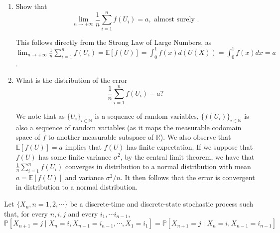 \documentclass[12pt,twoside, letter]{exam}
\theoremstyle{definition}
\newcommand{\nn}{\mathbb{N}}
\newcommand{\rr}{\mathbb{R}}
\newcommand{\ee}{\mathbb{E}}
\newcommand{\pp}{\mathbb{P}}
\begin{document}
\begin{enumerate}
  \item Show that
    \begin{equation*}
      \lim_{n \rightarrow +\infty} \frac{1}{n} \sum^n_{i=1} f(U_{i}) = a, \text{ almost surely }.
    \end{equation*}

    \begin{solution}
      This follows directly from the Strong Law of Large Numbers, as \\
      $\lim_{n \rightarrow +\infty} \frac{1}{n} \sum^n_{i=1} f(U_{i}) = \ee[f(U)] = \int^1_0 f(x) d(U(X)) = \int^1_0 f(x) dx = a$.
    \end{solution}

  \item What is the distribution of the error
    \begin{equation*}
      \frac{1}{n} \sum^{n}_{i = 1} f(U_{i}) - a?
    \end{equation*}

    \begin{solution}
      We note that as $\{U_i\}_{i\in\nn}$ is a sequence of random variables, $\{f(U_i)\}_{i\in\nn}$ is also a sequence of random variables (as it maps the measurable codomain space of $f$ to
      another measurable subspace of $\rr$). We also observe that $\ee[f(U)] = a$ implies that $f(U)$ has finite expectation. If we suppose that $f(U)$ has some finite variance $\sigma^{2}$, by
      the central limit theorem, we have that $\frac{1}{n} \sum^{n}_{i = 1} f(U_{i})$ converges in distribution to a normal distribution with mean $a = \ee[f(U)]$ and variance $\sigma^{2}/n$.
      It then follows that the error is convergent in distribution to a normal distribution.
    \end{solution}

\end{enumerate}

\par{Let $\{X_{n}, n = 1,2, \cdots \}$ be a discrete-time and discrete-state stochastic process such that, for every $n, i, j$ and every $i_1, \cdots i_{n-1}$,}
\begin{equation*}
  \pp[X_{n+1} = j \mid X_n = i, X_{n-1} = i_{n-1}, \cdots, X_{1} = i_1] = \pp[X_{n+1} = j \mid X_{n} = i, X_{n-1}=i_{n-1}]
\end{equation*}
\end{document}
